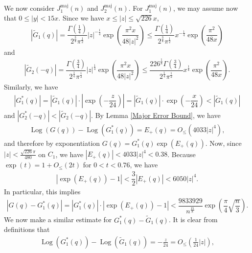 \documentclass[11pt,reqno]{amsart}
\theoremstyle{definition}
\theoremstyle{plain}
\theoremstyle{named}
\DeclareMathOperator\Log{Log}
\numberwithin{equation}{section}
\theoremstyle{example}
\def\lp{\left(}
\def\rp{\right)}
\begin{document}
We now consider $J^{\text{maj}}_1(n)$ and $J^{\text{maj}}_2(n)$. For $J_1^{\text{maj}}(n)$, we may assume now that $0 \leq |y| < 15x$. Since we have $x \leq |z| \leq \sqrt{226} x$,
\begin{align*}
    \left| \widetilde{G}_1(q) \right| = \dfrac{\Gamma\lp \frac 14 \rp}{2^{\frac 34} \pi^{\frac 12}} |z|^{- \frac 14} \exp\lp \dfrac{\pi^2x}{48|z|^2} \rp \leq \dfrac{\Gamma\lp \frac 14 \rp}{2^{\frac 34} \pi^{\frac 12}} x^{- \frac 14} \exp\lp \dfrac{\pi^2}{48x} \rp
\end{align*}
and
\begin{align*}
    \left| \widetilde{G}_2(-q) \right| = \dfrac{\Gamma\lp \frac 34 \rp}{2^{\frac 14} \pi^{\frac 12}} |z|^{\frac 14} \exp\lp \dfrac{\pi^2x}{48|z|^2} \rp \leq \dfrac{226^{\frac 18} \Gamma\lp \frac 34 \rp}{2^{\frac 14} \pi^{\frac 12}} x^{\frac 14} \exp\lp \dfrac{\pi^2}{48x} \rp.
\end{align*}
Similarly, we have
\begin{align*}
	\left|G_1^*(q)\right| = \left|\widetilde{G}_1(q)\right| \cdot \left|\exp\lp - \dfrac{z}{24} \rp \right| = \left|\widetilde{G}_1(q)\right| \cdot \exp\lp - \dfrac{x}{24} \rp < \left| \widetilde{G}_1(q) \right|
\end{align*}
and $\left|G_2^*(-q)\right| < \left|\widetilde{G}_2(-q)\right|$. By Lemma \ref{Major Error Bound}, we have
\begin{align*}
    \Log\lp G(q) \rp - \Log\lp G_1^*(q) \rp = E_+(q) = O_{\leq}\lp 4033 |z|^4 \rp,
\end{align*}
and therefore by exponentiation $G(q) = G_1^*(q) \exp\lp E_+(q) \rp$. Now, since $|z| < \frac{\sqrt{226} \pi}{480}$ on $C_1$, we have $\left| E_+(q) \right| < 4033 |z|^4 < 0.38$. Because $\exp\lp t \rp = 1 + O_{\leq}\lp 2 t \rp$ for $0 < t < 0.76$, we have
\begin{align*}
    \left| \exp\lp E_+(q) \rp - 1 \right| < \dfrac{3}{2} \left| E_+(q) \right| < 6050 |z|^4.
\end{align*}
In particular, this implies
\begin{align*}
    \left| G(q) - G_1^*(q) \right| = \left| G_1^*(q) \right| \cdot \left| \exp\lp E_+(q) \rp - 1 \right| < \dfrac{9833929}{n^{\frac{15}{8}}} \exp\lp \dfrac{\pi}{4} \sqrt{\dfrac{n}{3}} \rp.
\end{align*}
We now make a similar estimate for $G_1^*(q) - \widetilde{G}_1(q)$. It is clear from definitions that 
\begin{align*}
	\Log\lp G_1^*(q) \rp - \Log\lp \widetilde{G}_1(q) \rp = - \frac{z}{24} = O_{\leq}\lp \frac{1}{24} |z| \rp,
\end{align*}
\end{document}
